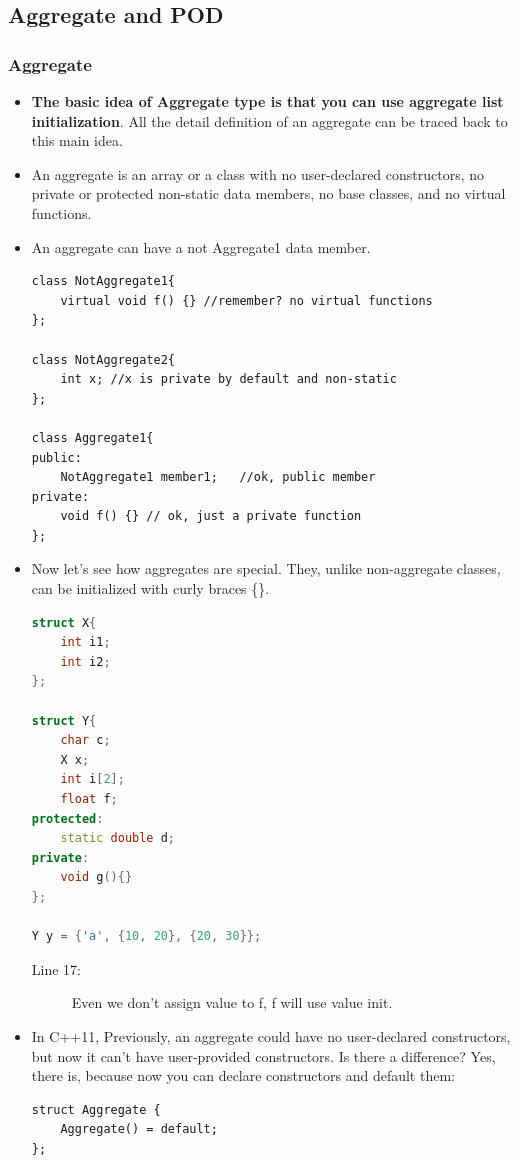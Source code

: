 \documentclass[a4paper,11pt,twoside]{book}
\begin{document}
\subsection{Aggregate and POD}
\subsubsection{Aggregate}
\begin{itemize}
	\item \textbf{The basic idea of Aggregate type is that you can use aggregate list initialization}. All the detail definition of an aggregate can be traced back to this main idea. 
	
	\item An aggregate is an array or a class with no user-declared constructors, no private or protected non-static data members, no base classes, and no virtual functions.
	
	\item  An aggregate can have a not Aggregate1 data member.
\begin{lstlisting}[numbers=none]
class NotAggregate1{
	virtual void f() {} //remember? no virtual functions
};
	
class NotAggregate2{
	int x; //x is private by default and non-static 
};
	
class Aggregate1{
public:
	NotAggregate1 member1;   //ok, public member
private:
	void f() {} // ok, just a private function
};
\end{lstlisting}
	
	\item Now let's see how aggregates are special. They, unlike non-aggregate classes, can be initialized with curly braces \{\}. 
\begin{lstlisting}[frame=single, language=c++]
struct X{
	int i1;
	int i2;
};
	
struct Y{
	char c;
	X x;
	int i[2];
	float f; 
protected:
	static double d;
private:
	void g(){}      
}; 
	
Y y = {'a', {10, 20}, {20, 30}};
\end{lstlisting}
\begin{description}
	\item[Line 17:] Even we don't assign value to f, f will use value init. 
\end{description}
	
	\item In C++11, Previously, an aggregate could have no user-declared constructors, but now it can't have user-provided constructors. Is there a difference? Yes, there is, because now you can declare constructors and default them:
\begin{lstlisting}[numbers=none]
struct Aggregate {
	Aggregate() = default; 
};
\end{lstlisting}
	

\end{itemize}
\end{document}
